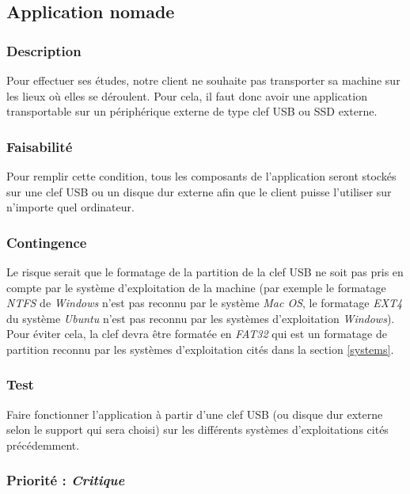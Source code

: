 \subsection{Application nomade}\label{nomadite}

\subsubsection{Description}

Pour effectuer ses études, notre client ne souhaite pas transporter sa machine sur les lieux où elles se déroulent. Pour cela, il faut donc avoir une application transportable sur un périphérique externe de type clef USB ou SSD externe.

\subsubsection{Faisabilité}

Pour remplir cette condition, tous les composants de l’application seront stockés sur une clef USB ou un disque dur externe afin que le client puisse l'utiliser sur n’importe quel ordinateur.

\subsubsection{Contingence}

Le risque serait que le formatage de la partition de la clef USB ne soit pas pris en compte par le système d’exploitation de la machine (par exemple le formatage \textit{NTFS} de \textit{Windows} n’est pas reconnu par le système \textit{Mac OS}, le formatage \textit{EXT4} du système \textit{Ubuntu} n’est pas reconnu par les systèmes d’exploitation \textit{Windows}). Pour éviter cela, la clef devra être formatée en \textit{FAT32} qui est un formatage de partition reconnu par les systèmes d’exploitation cités dans la section \ref{systems}.

\subsubsection{Test}

Faire fonctionner l’application à partir d’une clef USB (ou disque dur externe selon le support qui sera choisi) sur les différents systèmes d’exploitations cités précédemment.

\subsubsection{Priorité : \textit{Critique}}

